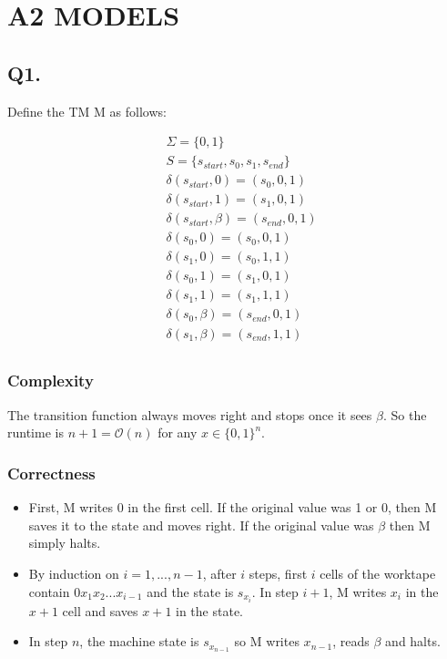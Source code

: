 \documentclass[letterpaper]{article}
\begin{document}
\flushleft
\renewcommand{\labelitemiii}{\(\smallblackcircle\)}
\renewcommand{\labelitemii}{\(\smallblackcircle\)}

\lstset{
      basicstyle=\ttfamily,
      mathescape
}

\section*{A2 MODELS}

\subsection*{Q1.}

Define the TM M as follows:

\begin{align*}
       & \Sigma = \{0, 1\}                          \\
       & S = \{ s_{start}, s_0, s_1, s_{end}\}      \\
       & \delta (s_{start}, 0)= (s_0, 0, 1)         \\
       & \delta (s_{start}, 1) = (s_1, 0, 1)        \\
       & \delta (s_{start}, \beta)= (s_{end}, 0, 1) \\
       & \delta (s_{0}, 0)= (s_0, 0, 1)             \\
       & \delta (s_{1}, 0)= (s_0, 1, 1)             \\
       & \delta (s_{0}, 1) = (s_1, 0, 1)            \\
       & \delta (s_{1}, 1) = (s_1, 1, 1)            \\
       & \delta (s_{0}, \beta)= (s_{end}, 0, 1)     \\
       & \delta (s_{1}, \beta)= (s_{end}, 1, 1)     \\
\end{align*}

\subsubsection*{Complexity}
The transition function always moves right and stops once it sees $\beta$.
So the runtime is $n+1=\mathcal{O} (n)$ for any $x \in \{0, 1\}^n$.

\subsubsection*{Correctness}
\begin{itemize}
      \item First, M writes 0 in the first cell. If the original value was 1 or 0,
            then M saves it to the state and moves right. If the original value was
            $\beta$ then M simply halts.
      \item By induction on $i=1,...,n-1$, after $i$ steps, first $i$ cells of
            the worktape contain $0 x_1 x_2 ... x_{i-1}$ and the state is $s_{x_i}$.
            In step $i+1$, M writes $x_i$ in the $x+1$ cell and saves $x+1$ in the state.
      \item In step $n$, the machine state is $s_{x_{n-1}}$ so M writes
            $x_{n-1}$, reads $\beta$ and halts.
\end{itemize}
\end{document}
